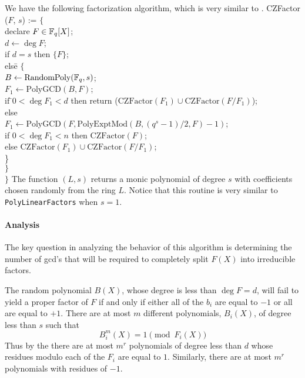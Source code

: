 We have the following factorization algorithm, which is very
similar to .  
\begindsacode
CZFactor ($F$, $s$) := $\{$ \\
\> declare $F \in \mathbb{F}_q[X]$; \\
\> $d \leftarrow \deg F$; \\
\> if $d = s$ then $\{ F \}$; \\
\> els\=e $\{$\\
\>\> $B \leftarrow \mbox{RandomPoly}(\mathbb{F}_q, s)$; \\
\>\> $F_1 \leftarrow \mbox{PolyGCD}(B, F)$; \\
\>\> if \=$0 < \deg F_1 <  d$ then return ($\mbox{CZFactor}(F_1) \cup
   \mbox{CZFactor}(F/F_1)$); \\
\>\> else \\
\>\>\> $F_1 \leftarrow 
   \mbox{PolyGCD}(F, \mbox{PolyExptMod}(B, (q^s-1)/2, F) -1)$;\\
\>\>\> if $0 < \deg F_1 < n$ then $\mbox{CZFactor}(F)$;\\
\>\>\> else $\mbox{CZFactor}(F_1) \cup \mbox{CZFactor}(F/F_1)$;\\
\>\>\> \} \\
\>\> $\}$\\
\> $\}$
\enddsacode
{}
The function
$(L, s)$ returns a monic polynomial of degree $s$
with coefficients chosen randomly from the ring $L$.  Notice that this
routine is very similar to {\tt PolyLinearFactors} when $s = 1$.

\paragraph{Analysis}

The key question in analyzing the behavior of this algorithm is
determining the number of {\sc gcd}'s that will be required to
completely split $F(X)$ into irreducible factors.  

The random polynomial $B(X)$, whose degree is less than $\deg F = d$, will fail to yield a
proper factor of $F$ if and only if either all of the $b_i$ are equal
to $-1$ or all are equal to $+1$.  There are at most $m$ different
polynomials, $B_i(X)$, of degree less than $s$ such that 
\[
B_i^m(X) = 1 \pmod{F_i(X)}
\]
Thus by the  there are at most $m^r$
polynomials of degree less than $d$ whose residues modulo each of the
$F_i$ are equal to $1$.  Similarly, there are at most $m^r$
polynomials with residues of $-1$.

